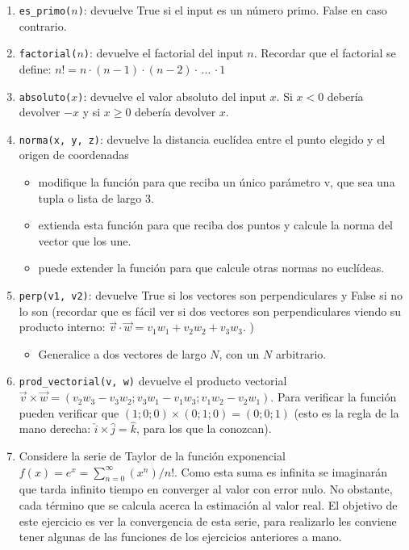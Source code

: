 \documentclass[a4paper]{article}
\begin{document}
\begin{enumerate}
	\item \texttt{es\_primo($n$)}: devuelve True si el input es un número primo. False en caso contrario.
	\item \texttt{factorial($n$)}: devuelve el factorial del input $n$. Recordar que el factorial se define: $n! = n\cdot(n-1)\cdot(n-2)\cdot \,\ldots\, \cdot1$
	\item \texttt{absoluto($x$)}: devuelve el valor absoluto del input $x$. Si $x<0$ debería devolver $-x$ y si $x\ge 0$ debería devolver $x$.
	\item \texttt{norma(x, y, z)}: devuelve la distancia euclídea entre el punto elegido y el origen de coordenadas
		\begin{itemize}
			\item modifique la función para que reciba un único parámetro v, que sea una tupla o lista de largo 3.
			\item extienda esta función para que reciba dos puntos y calcule la norma del vector que los une.
			\item puede extender la función para que calcule otras normas no euclídeas.
		\end{itemize}
	\item \texttt{perp(v1, v2)}: devuelve True si los vectores son perpendiculares y False si no lo son (recordar que es fácil ver si dos vectores son perpendiculares viendo su producto interno: $\vec{v}\cdot \vec{w} = v_1w_1 + v_2w_2 + v_3 w_3$. )
		\begin{itemize}
			\item Generalice a dos vectores de largo $N$, con un $N$ arbitrario.
		\end{itemize}
	\item \texttt{prod\_vectorial(v, w)} devuelve el producto vectorial $\vec{v}\times \vec{w} = (v_2 w_3 - v_3 w_2; v_3 w_1 - v_1 w_3; v_1 w_2 - v_2 w_1)$. Para verificar la función pueden verificar que $(1;0;0)\times (0;1;0) = (0;0;1)$ (esto es la regla de la mano derecha: $\hat{i} \times \hat{j} = \hat{k}$, para los que la conozcan).
	\item Considere la serie de Taylor de la función exponencial $f(x)=e^x=\sum\limits_{n=0}^{\infty} (x^n) / n!$. Como esta suma es infinita se imaginarán que tarda infinito tiempo en converger al valor con error nulo. No obstante, cada término que se calcula acerca la estimación al valor real. El objetivo de este ejercicio es ver la convergencia de esta serie, para realizarlo les conviene tener algunas de las funciones de los ejercicios anteriores a mano.\\

\end{enumerate}
\end{document}
